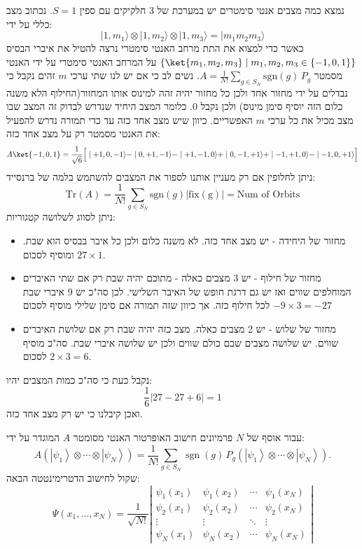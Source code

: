 \documentclass{tstextbook}
\begin{document}
\begin{example}
נמצא כמה מצבים אנטי סימטרים יש במערכת של 3 חלקיקים עם ספין \(S=1\). נכתוב מצב כללי על ידי:
$$|1,m_{1}\rangle\otimes|1,m_{2}\rangle\otimes|1,m_{3}\rangle=|m_{1}m_{2}m_{3}\rangle$$
כאשר כדי למצוא את התת מרחב האנטי סימטרי נרצה להטיל את איברי הבסיס \(\left\{  \ket{m_{1},m_{2},m_{3}}\mid m_{1},m_{2},m_{3} \in\{ -1,0,1 \} \right\}\) על המרחב האנטי סימטרי על ידי האנטי מסמטר \(A=\frac{1}{N!}\sum_{g\in S_{N}}\mathrm{sgn}(g)\,P_{g}\). נשים לב כי אם יש לנו שתי ערכי \(m\) זהים נקבל כי נבדלים על ידי מחזור אחד ולכן כל מחזור יהיה זהה למינוס אותו המחזור(החילוף הלא משנה כלום הזה יוסיף סימן מינוס) ולכן נקבל 0. כלומר המצב היחיד שנדרש לבדוק זה המצב שבו מצב מכיל את כל ערכי \(m\) האפשריים. כיוון שיש מצב אחד כזה עד כדי תמורה נדרש להפעיל את האנטי מסמטר רק על מצב אחד כזה:
$$A\ket{-1,0,1} ={\frac{1}{\sqrt{6}}}{\Big[}\mid+1,0,-1\rangle-\mid0,+1,-1\rangle-\mid+1,-1,0\rangle+\mid0,-1,+1\rangle+\mid-1,+1,0\rangle-\mid-1,0,+1\rangle{\Big]}$$
ניתן לחלופין אם רק מעניין אותנו לספור את המצבים להשתמש בלמה של ברנסייד:
$$\mathrm{Tr}(A)=\frac{1}{N!}\sum_{g \in S_{N}}\mathrm{sgn}(g)|\mathrm{fix(g)|}=\text{Num of Orbits}$$
ניתן לסווג לשלושה קטגוריות:

  \begin{itemize}
    \item מחזור של היחידה - יש מצב אחד כזה. לא משנה כלום ולכן כל איבר בבסיס הוא שבת. ומוסיף לסכום \(27 \times 1\).
    \item מחזור של חילוף - יש 3 מצבים כאלה - מתוכם יהיה שבת רק אם שתי האיברים המוחלפים שווים ואז יש גם דרגת חופש של האיבר השלישי. לכן סה"כ יש 9 איברי שבת לכל חילוף כזה. אך כיוון שזה תמורה אם סימן שלילי מוסיף לסכום \(-9 \times 3 = -27\)
    \item מחזור של שלוש - יש 2 מצבים כאלה. מצב כזה יהיה שבת רק אם שלושת האיברים שווים. יש שלושה מצבים שבם כולם שווים ולכן יש שלושה איברי שבת. סה"כ מוסיף לסכום \(2\times 3 = 6\).
  \end{itemize}
נקבל כעת כי סה"כ כמות המצבים יהיו:
$$\frac{1}{6}\lvert 27-27+6 \rvert =1$$
ואכן קיבלנו כי יש רק מצב אחד כזה.

\end{example}
\begin{proposition}
עבור אוסף של \(N\) פרמיונים חישוב האופרטור האנטי מסומטר \(A\) המוגדר על ידי:
$$A\left(\left|\psi_{1}\right\rangle\otimes\cdots\otimes\left|\psi_{N}\right\rangle\right)=\frac{1}{N!}\sum_{g\in S_{N}}\operatorname{sgn}(g)\,P_{g}\left(\left|\psi_{1}\right\rangle\otimes\cdots\otimes\left|\psi_{N}\right\rangle\right).$$
שקול לחישוב הדטרימינטטה הבאה:
$$\Psi(x_{1},\ldots,x_{N})=\frac{1}{\sqrt{N!}}\left|\begin{array}{cccc}{{\psi_{1}(x_{1})}}&{{\psi_{1}(x_{2})}}&{{\cdots}}&{{\psi_{1}(x_{N})}}\\ {{\psi_{2}(x_{1})}}&{{\psi_{2}(x_{2})}}&{{\cdots}}&{{\psi_{2}(x_{N})}}\\ {{\vdots}}&{{\vdots}}&{{\ddots}}&{{\vdots}}\\ {{\psi_{N}(x_{1})}}&{{\psi_{N}(x_{2})}}&{{\cdots}}&{{\psi_{N}(x_{N})}}\end{array}\right|$$

\end{proposition}
\end{document}
